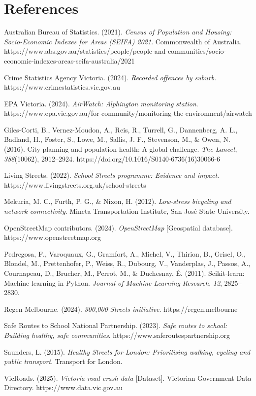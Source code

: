 \documentclass[11pt,a4paper]{article}
\begin{document}
\section*{References}
{\small
\setlength{\parindent}{0pt}
\setlength{\hangindent}{2em}
\setlength{\parskip}{5pt}

Australian Bureau of Statistics. (2021). \textit{Census of Population and Housing: Socio-Economic Indexes for Areas (SEIFA) 2021}. Commonwealth of Australia. https://www.abs.gov.au/statistics/people/people-and-communities/socio-economic-indexes-areas-seifa-australia/2021

Crime Statistics Agency Victoria. (2024). \textit{Recorded offences by suburb}. https://www.crimestatistics.vic.gov.au

EPA Victoria. (2024). \textit{AirWatch: Alphington monitoring station}. https://www.epa.vic.gov.au/for-community/monitoring-the-environment/airwatch

Giles-Corti, B., Vernez-Moudon, A., Reis, R., Turrell, G., Dannenberg, A. L., Badland, H., Foster, S., Lowe, M., Sallis, J. F., Stevenson, M., \& Owen, N. (2016). City planning and population health: A global challenge. \textit{The Lancet}, \textit{388}(10062), 2912--2924. https://doi.org/10.1016/S0140-6736(16)30066-6

Living Streets. (2022). \textit{School Streets programme: Evidence and impact}. https://www.livingstreets.org.uk/school-streets

Mekuria, M. C., Furth, P. G., \& Nixon, H. (2012). \textit{Low-stress bicycling and network connectivity}. Mineta Transportation Institute, San José State University.

OpenStreetMap contributors. (2024). \textit{OpenStreetMap} [Geospatial database]. https://www.openstreetmap.org

Pedregosa, F., Varoquaux, G., Gramfort, A., Michel, V., Thirion, B., Grisel, O., Blondel, M., Prettenhofer, P., Weiss, R., Dubourg, V., Vanderplas, J., Passos, A., Cournapeau, D., Brucher, M., Perrot, M., \& Duchesnay, É. (2011). Scikit-learn: Machine learning in Python. \textit{Journal of Machine Learning Research}, \textit{12}, 2825--2830.

Regen Melbourne. (2024). \textit{300,000 Streets initiative}. https://regen.melbourne

Safe Routes to School National Partnership. (2023). \textit{Safe routes to school: Building healthy, safe communities}. https://www.saferoutespartnership.org

Saunders, L. (2015). \textit{Healthy Streets for London: Prioritising walking, cycling and public transport}. Transport for London.

VicRoads. (2025). \textit{Victoria road crash data} [Dataset]. Victorian Government Data Directory. https://www.data.vic.gov.au
}
\end{document}
